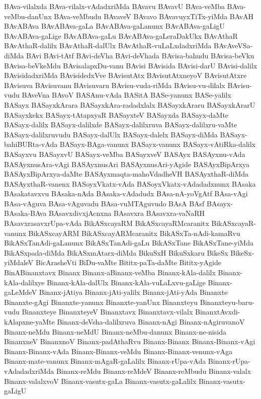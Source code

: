 {BAva-vilalxda
BAva-vilalx-vAdadxriMda
BAvavu
BAvavU
BAva-veMba
BAva-veMbu-danUnx
BAva-veMbudu
BAvaveV
BAvavo
BAvavuyxTiTx-yiMda
BAvAH
BAvABAva
BAvABAva-gaLa
BAvABAva-gaLanunx
BAvABAva-gaLigU
BAvABAva-gaLige
BAvABAva-gaLu
BAvABAva-gaLeraDakUkx
BAvAthaR
BAvAthaR-dalilx
BAvAthaR-dalUlx
BAvAthaR-vuLaLxdadxriMda
BAvAveVSa-diMda
BAvi
BAvi-tAtf
BAvi-deVha
BAvi-deVhada
BAvisa-bahudu
BAvisa-beVku
BAvisa-beVkeMdu
BAvisalapxDu-vanu
BAvisi
BAvisida
BAvisi-darU
BAvisi-dalilx
BAvisidadxriMda
BAvisidedxVve
BAvisutAtx
BAvisutAtxneyoV
BAvisutAtxre
BAvisuva
BAvisuvanu
BAvisuvaru
BAvisu-vuda-riMda
BAvisu-vu-dilalx
BAvisu-vudu
BAveVna
BAvoV
BASAnu-vAda
BASitA
BASe-yanunx
BASe-yalilx
BASayx
BASayxkArara
BASayxkAra-radadxlalx
BASayxkAraru
BASayxkArarU
BASayxkekx
BASayx-tAtapxyaR
BASayxteV
BASayxda
BASayx-daMte
BASayx-dalilx
BASayx-dalilxde
BASayx-dalilxruva
BASayx-dalilxru-vaMte
BASayx-dalilxruvudu
BASayx-dalUlx
BASayx-dalelx
BASayx-diMda
BASayx-bahiBURta-vAda
BASayx-BAga-vanunx
BASayx-vanunx
BASayx-vAtiRka-dalilx
BASayxvu
BASayxvU
BASayx-veMba
BASayxveV
BASAyx
BASAyxnu-vAda
BASAyxnusAra-vAgi
BASAyxnusAri
BASAyxnusAri-yAgide
BASAyxBipArxya
BASAyxBipArxya-daMte
BASAyxmaqta-mahoVdadheVH
BASAyxthaR-diMda
BASAyxthaR-vanenx
BASoyxVkatx-vAda
BASoyxVkatx-vAdadadxnunx
BAsaka
BAsakatavxvu
BAsaka-nAda
BAsaka-vAdadudx
BAsa-nA-yoVgAtf
BAsa-vAgi
BAsa-vAguva
BAsa-vAguvadu
BAsa-vuMTAguvudo
BAsA
BAsf
BAsayx-BAsaka-BAva
BAsavxdivxjAcnxna
BAsavxra
BAsavxra-vaNaRH
BAsavxrasavxrUpa-vAda
BikASxcayaRM
BikASxcayaRMcaranitx
BikASxcayaR-vanunx
BikASxcayARM
BikASxcayARMcaranitx
BikASxTa-nAdi-kamaRvu
BikASxTanAdi-gaLanunx
BikASxTanAdi-gaLu
BikASxTane
BikASxTane-yiMda
BikASxpada-diMda
BikASxmAtarx-diMda
BikuSxH
BikuSxkaru
BikeSx
BikeSx-yiMdaleV
BicArasheVti
BiDu-vaMte
Bititx-paTa-daMte
Bititx-yAgide
BinABinanxtavx
Binanx
Binanx-aBinanx-veMba
Binanx-kAla-dalilx
Binanx-kAla-dalilxye
Binanx-kAla-dalUlx
Binanx-kAla-vuLaLxvu-gaLige
Binanx-gaLeMdeV
Binanx-jAtiya
Binanx-jAti-yalilx
Binanx-jAti-yAda
Binanxte
Binanxte-gAgi
Binanxte-yanunx
Binanxte-yanUnx
Binanxteyu
Binanxteyu-baru-vudu
Binanxteye
BinanxteyeV
Binanxtavx
Binanxtavx-vilalx
BinanxtAvxdi-kAlapxne-yaMte
Binanx-deVsha-dalilxruva
Binanx-nAgi
Binanx-nAgiruvanoV
Binanx-neMdu
Binanx-neMdU
Binanx-neMbu-danunx
Binanx-ne-nisida
BinanxneV
BinanxnoV
Binanx-padAthaRvu
Binanx-Binanx
Binanx-Binanx-vAgi
Binanx-Binanx-vAda
Binanx-Binanx-veMdu
Binanx-Binanx-venunx-vAga
Binanx-mate-vanunx
Binanx-mAgaR-gaLalilx
Binanx-rUpa-vAda
Binanx-rUpa-vAdadadxriMda
Binanx-reMdu
Binanx-reMdeV
Binanx-reMbudu
Binanx-valalx
Binanx-valalxvoV
Binanx-vasutx-gaLa
Binanx-vasutx-gaLalilx
Binanx-vasutx-gaLigU
}
